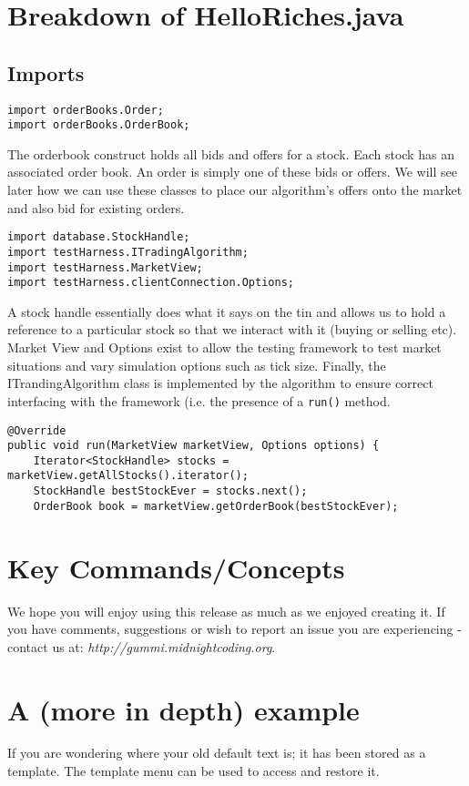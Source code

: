 \documentclass[11pt]{article}
\begin{document}
\section{Breakdown of HelloRiches.java}
\subsection{Imports}
\begin{lstlisting}
import orderBooks.Order;
import orderBooks.OrderBook;
\end{lstlisting}
The orderbook construct holds all bids and offers for a stock. Each stock has an associated order book. An order is simply one of these bids or offers. We will see later how we can use these classes to place our algorithm's offers onto the market and also bid for existing orders.\\
\begin{lstlisting}
import database.StockHandle;
import testHarness.ITradingAlgorithm;
import testHarness.MarketView;
import testHarness.clientConnection.Options;
\end{lstlisting}
A stock handle essentially does what it says on the tin and allows us to hold a reference to a particular stock so that we interact with it (buying or selling etc). Market View and Options exist to allow the testing framework to test market situations and vary simulation options such as tick size. Finally, the ITrandingAlgorithm class is implemented by the algorithm to ensure correct interfacing with the framework (i.e. the presence of a \texttt{run()} method.\\

\begin{lstlisting}
@Override
public void run(MarketView marketView, Options options) {
	Iterator<StockHandle> stocks = marketView.getAllStocks().iterator();
	StockHandle bestStockEver = stocks.next();
	OrderBook book = marketView.getOrderBook(bestStockEver);
\end{lstlisting}

\section{Key Commands/Concepts}
We hope you will enjoy using this release as much as we enjoyed creating it. If you have comments, suggestions or wish to report an issue you are experiencing - contact us at: \emph{http://gummi.midnightcoding.org}.

\section{A (more in depth) example}
If you are wondering where your old default text is; it has been stored as a template. The template menu can be used to access and restore it. 
\end{document}
